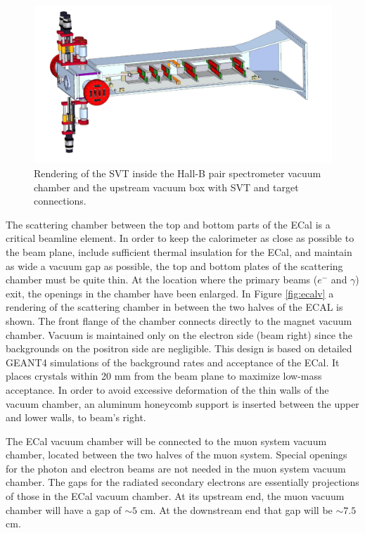 \begin{figure}[t]
\includegraphics[scale=0.75]{beamline/svt_in.pdf}
\caption{\small{Rendering of the SVT inside the Hall-B pair spectrometer vacuum chamber and the upstream vacuum box with SVT and target connections.}}\label{fig:svtvbox}
\end{figure}

The scattering chamber between the top and bottom parts of the ECal is a critical beamline element. In order to keep the calorimeter as close as 
possible to the beam plane, include sufficient thermal insulation for the ECal, and maintain as wide a vacuum gap as possible, the top and bottom 
plates of the scattering chamber must be quite thin. At the location where the primary beams  ($e^-$ and $\gamma$) exit, the openings in the 
chamber have been enlarged. In Figure \ref{fig:ecalv} a rendering of the scattering chamber in between the two halves of the ECAL is shown. The 
front flange of the chamber connects directly to the magnet vacuum chamber. Vacuum is maintained only on the electron side (beam right) since 
the backgrounds on the positron side are negligible.  
This design is based on detailed GEANT4 simulations of the background rates and acceptance of the ECal. It places crystals within 20 mm 
from the beam plane to maximize low-mass acceptance. In order to avoid excessive deformation of the thin walls of the vacuum chamber, an aluminum 
honeycomb support is inserted between the upper and lower walls, to beam's right.

The ECal vacuum chamber will be connected to the muon system vacuum chamber, located between the two halves of the muon system. Special openings for 
the photon and electron beams are not needed in the muon system vacuum chamber. The gaps for the radiated secondary electrons are essentially 
projections of those in the ECal vacuum chamber. At its 
upstream end, the muon vacuum chamber will have a gap of $\sim 5$ cm. At the downstream end that gap will be $\sim 7.5$ cm.

